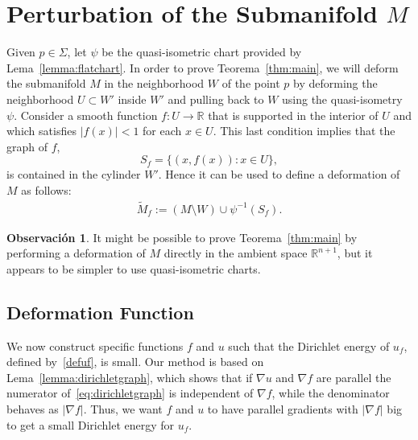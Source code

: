 \documentclass{GEM-JNL-FMP}
\theoremstyle{definition}
\newtheorem{remark}[theorem]{Observación}
\numberwithin{equation}{section}
\begin{document}
\section{Perturbation of the Submanifold $M$}\label{section:perturbation}

Given $p\in\Sigma$, let $\psi$ be the quasi-isometric chart provided by Lema~\ref{lemma:flatchart}. In order to prove Teorema~\ref{thm:main}, we will deform the submanifold $M$ in the neighborhood $W$ of the point $p$ by deforming the neighborhood $U\subset W'$ inside $W'$ and pulling back to $W$ using the quasi-isometry $\psi$.
Consider a smooth function $f\colon U\rightarrow\mathbb{R}$ that is supported in the interior of $U$ and which satisfies $|f(x)|<1$ for each $x\in U$. This last condition implies that the graph of $f$,
$$S_f = \{(x, f(x)) : x\in U\},
$$
is contained in the cylinder $W'$.
Hence it can be used to define a deformation of $M$ as follows:
\begin{gather}\label{def:TM}
\widetilde{M}_f:=(M\setminus W)\cup\psi^{-1}(S_f).
\end{gather}

\begin{remark}
  It might be possible to prove Teorema~\ref{thm:main} by performing a deformation of $M$ directly in the ambient space $\mathbb{R}^{n+1}$, but it appears to be simpler to use quasi-isometric charts.
\end{remark}

\subsection{Deformation Function}

We now construct specific functions $f$ and $u$ such that the Dirichlet energy of $u_f$, defined by~\eqref{defuf}, is small. Our method is based on Lema~\ref{lemma:dirichletgraph}, which shows that if $\nabla u$ and $\nabla f$ are parallel the numerator of~\eqref{eq:dirichletgraph} is independent of $\nabla f$, while the denominator behaves as $|\nabla f|$. Thus, we want $f$ and $u$
to have parallel gradients with $|\nabla f|$ big to get a small Dirichlet
energy for $u_f$.
\end{document}
